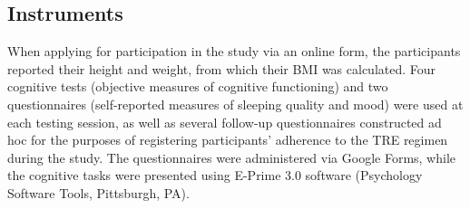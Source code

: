 \documentclass[authordate, empirical]{jote-new-article}
\begin{document}
\subsection{Instruments }



When applying for participation in the study via an online form, the participants reported their height and weight, from which their BMI was calculated. Four cognitive tests (objective measures of cognitive functioning) and two questionnaires (self-reported measures of sleeping quality and mood) were used at each testing session, as well as several follow-up questionnaires constructed ad hoc for the purposes of registering participants' adherence to the TRE regimen during the study. The questionnaires were administered via Google Forms, while the cognitive tasks were presented using E-Prime 3.0 software (Psychology Software Tools, Pittsburgh, PA).
\end{document}
